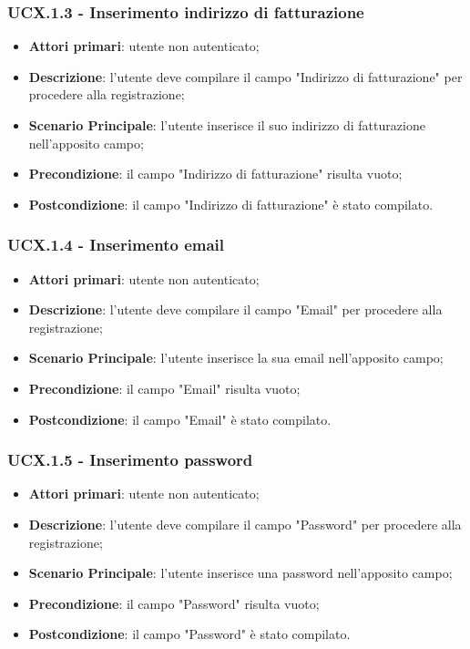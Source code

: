 \subsubsection{UCX.1.3 - Inserimento indirizzo di fatturazione}
\begin{itemize}
\item \textbf{Attori primari}: utente non autenticato;
\item \textbf{Descrizione}: l'utente deve compilare il campo "Indirizzo di fatturazione" per procedere alla registrazione;
\item \textbf{Scenario Principale}: l'utente inserisce il suo indirizzo di fatturazione nell'apposito campo;
\item \textbf{Precondizione}: il campo "Indirizzo di fatturazione" risulta vuoto;
\item \textbf{Postcondizione}: il campo "Indirizzo di fatturazione" è stato compilato.
\end{itemize}

\subsubsection{UCX.1.4 - Inserimento email}
\begin{itemize}
\item \textbf{Attori primari}: utente non autenticato;
\item \textbf{Descrizione}: l'utente deve compilare il campo "Email" per procedere alla registrazione;
\item \textbf{Scenario Principale}: l'utente inserisce la sua email nell'apposito campo;
\item \textbf{Precondizione}: il campo "Email" risulta vuoto;
\item \textbf{Postcondizione}: il campo "Email" è stato compilato.
\end{itemize}

\subsubsection{UCX.1.5 - Inserimento password}
\begin{itemize}
\item \textbf{Attori primari}: utente non autenticato;
\item \textbf{Descrizione}: l'utente deve compilare il campo "Password" per procedere alla registrazione;
\item \textbf{Scenario Principale}: l'utente inserisce una password nell'apposito campo;
\item \textbf{Precondizione}: il campo "Password" risulta vuoto;
\item \textbf{Postcondizione}: il campo "Password" è stato compilato.
\end{itemize}

